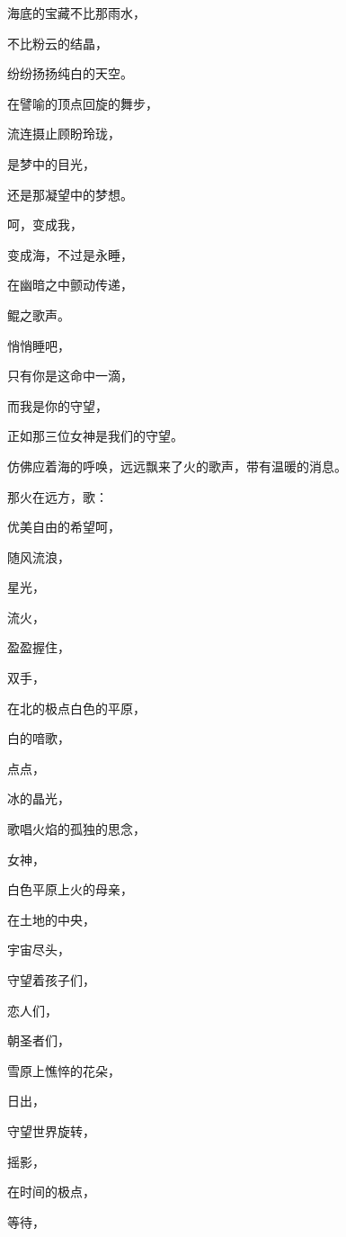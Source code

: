 \documentclass[UTF8]{article}
\begin{document}
\par 海底的宝藏不比那雨水，
\par 不比粉云的结晶，
\par 纷纷扬扬纯白的天空。
\par 在譬喻的顶点回旋的舞步，
\par 流连摄止顾盼玲珑，
\par 是梦中的目光，
\par 还是那凝望中的梦想。
\par 呵，变成我，
\par 变成海，不过是永睡，
\par 在幽暗之中颤动传递，
\par 鲲之歌声。
\par 悄悄睡吧，
\par 只有你是这命中一滴，
\par 而我是你的守望，
\par 正如那三位女神是我们的守望。
\\[0.6cm]
\par 仿佛应着海的呼唤，远远飘来了火的歌声，带有温暖的消息。
\\[0.6cm]
\par 那火在远方，歌：
\\[0.6cm]
\par 优美自由的希望呵，
\par 随风流浪，
\par 星光，
\par 流火，
\par 盈盈握住，
\par 双手，
\par 在北的极点白色的平原，
\par 白的喑歌，
\par 点点，
\par 冰的晶光，
\par 歌唱火焰的孤独的思念，
\par 女神，
\par 白色平原上火的母亲，
\par 在土地的中央，
\par 宇宙尽头，
\par 守望着孩子们，
\par 恋人们，
\par 朝圣者们，
\par 雪原上憔悴的花朵，
\par 日出，
\par 守望世界旋转，
\par 摇影，
\par 在时间的极点，
\par 等待，
\end{document}
